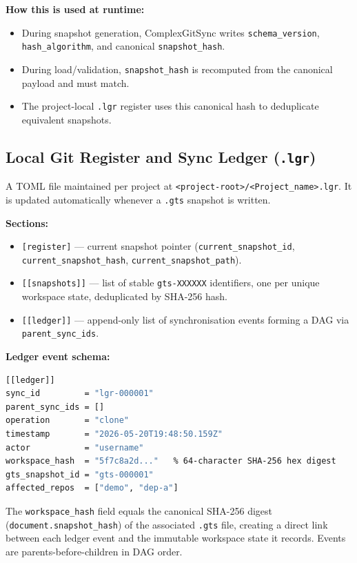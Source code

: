 \textbf{How this is used at runtime:}
\begin{itemize}
  \item During snapshot generation, ComplexGitSync writes
        \texttt{schema\_version}, \texttt{hash\_algorithm}, and canonical
        \texttt{snapshot\_hash}.
  \item During load/validation, \texttt{snapshot\_hash} is recomputed from the
        canonical payload and must match.
  \item The project-local \texttt{.lgr} register uses this canonical hash to
        deduplicate equivalent snapshots.
\end{itemize}

\subsection{Local Git Register and Sync Ledger (\texttt{.lgr})}

A TOML file maintained per project at \texttt{<project-root>/<Project\_name>.lgr}.
It is updated automatically whenever a \texttt{.gts} snapshot is written.

\textbf{Sections:}
\begin{itemize}
  \item \texttt{[register]} — current snapshot pointer (\texttt{current\_snapshot\_id},
        \texttt{current\_snapshot\_hash}, \texttt{current\_snapshot\_path}).
  \item \texttt{[[snapshots]]} — list of stable \texttt{gts-XXXXXX} identifiers,
        one per unique workspace state, deduplicated by SHA-256 hash.
  \item \texttt{[[ledger]]} — append-only list of synchronisation events forming
        a DAG via \texttt{parent\_sync\_ids}.
\end{itemize}

\textbf{Ledger event schema:}

\begin{lstlisting}[language=bash]
[[ledger]]
sync_id         = "lgr-000001"
parent_sync_ids = []
operation       = "clone"
timestamp       = "2026-05-20T19:48:50.159Z"
actor           = "username"
workspace_hash  = "5f7c8a2d..."   % 64-character SHA-256 hex digest
gts_snapshot_id = "gts-000001"
affected_repos  = ["demo", "dep-a"]
\end{lstlisting}

The \texttt{workspace\_hash} field equals the canonical SHA-256 digest
(\texttt{document.snapshot\_hash}) of the associated \texttt{.gts} file,
creating a direct link between each ledger event and the immutable workspace
state it records.  Events are parents-before-children in DAG order.

